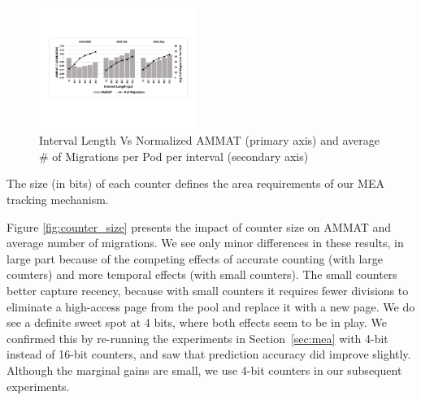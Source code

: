 \begin{figure}[h]
  \includegraphics[width=0.46\textwidth]{figures/interval_length_normalized.pdf}
  \caption{Interval Length Vs Normalized AMMAT (primary axis) and average \# of Migrations per Pod per interval (secondary axis)}
  \label{fig:interval}
\end{figure}

The size (in bits) of each counter defines the area requirements of our MEA tracking mechanism.  

Figure \ref{fig:counter_size} presents the impact of counter size on AMMAT and average number of migrations. We see only minor differences in these results,
in large part because of the competing effects of accurate counting (with
large counters) and more temporal effects (with small counters).
The small counters better capture recency, because with small counters it
requires fewer divisions to eliminate a high-access page from the pool and
replace it with a new page.  We do see a definite sweet spot at 4 bits,
where both effects seem to be in play.  We confirmed this by re-running the
experiments in Section~\ref{sec:mea} with 4-bit instead of 16-bit counters,
and saw that prediction accuracy did improve slightly.  Although the marginal
gains are small, we use 4-bit counters in our subsequent experiments.


